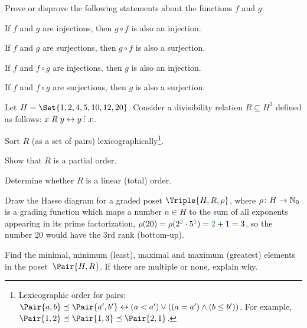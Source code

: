 \documentclass[a4paper,12pt]{article}
\begin{document}
\begin{tasks}
    \item Prove or disprove the following statements about the functions $f$ and $g$:

    \begin{subtasks}
        \item If $f$ and $g$ are injections, then $g \circ f$ is also an injection.

        \item If $f$ and $g$ are surjections, then $g \circ f$ is also a surjection.

        \item If $f$ and $f \circ g$ are injections, then $g$ is also an injection.

        \item If $f$ and $f \circ g$ are surjections, then $g$ is also a surjection.
    \end{subtasks}


    \item Let $H = \Set{1, 2, 4, 5, 10, 12, 20}$.
    Consider a divisibility relation $R \subseteq H^2$ defined as follows: $x \rel y \iff y \divby x$.

    \begin{subtasks}
        \item Sort $R$ (as a set of pairs) lexicographically\footnote{Lexicographic order for pairs: $\Pair{a,b} \preceq \Pair{a',b'} \iff (a < a') \lor ((a = a') \land (b \leq b'))$. For example, $\Pair{1,2} \preceq \Pair{1,3} \preceq \Pair{2,1}$.}.

        \item Show that $R$ is a partial order.

        \item Determine whether $R$ is a linear (total) order.

        \item Draw the Hasse diagram for a graded poset $\Triple{H, R, \rho}$, where $\rho \colon H \to \mathbb{N}_{0}$ is a grading function which maps a number $n \in H$ to the sum of all exponents appearing in its prime factorization, \eg $\rho(20) = \rho(2^{\mathcolor{my-green}{2}} \cdot 5^{\textcolor{my-blue}{1}}) = \mathcolor{my-green}{2} + \textcolor{my-blue}{1} = 3$, so the number 20 would have the 3rd rank (bottom-up).

        \item Find the minimal, minimum (least), maximal and maximum (greatest) elements in the poset~$\Pair{H, R}$.
        If there are multiple or none, explain why.


\end{subtasks}
\end{tasks}
\end{document}
